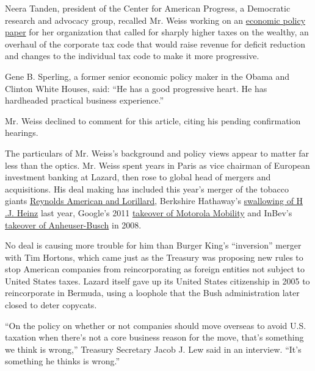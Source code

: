 Neera Tanden, president of the Center for American Progress, a
Democratic research and advocacy group, recalled Mr. Weiss working on an
\href{https://www.americanprogress.org/issues/tax-reform/report/2012/12/04/46689/reforming-our-tax-system-reducing-our-deficit/}{economic
policy paper} for her organization that called for sharply higher taxes
on the wealthy, an overhaul of the corporate tax code that would raise
revenue for deficit reduction and changes to the individual tax code to
make it more progressive.

Gene B. Sperling, a former senior economic policy maker in the Obama and
Clinton White Houses, said: ``He has a good progressive heart. He has
hardheaded practical business experience.''

Mr. Weiss declined to comment for this article, citing his pending
confirmation hearings.

The particulars of Mr. Weiss's background and policy views appear to
matter far less than the optics. Mr. Weiss spent years in Paris as vice
chairman of European investment banking at Lazard, then rose to global
head of mergers and acquisitions. His deal making has included this
year's merger of the tobacco giants
\href{http://dealbook.nytimes3xbfgragh.onion/2014/07/15/reynolds-american-to-buy-lorillard-for-27-4-billion/}{Reynolds
American and Lorillard}, Berkshire Hathaway's
\href{http://dealbook.nytimes3xbfgragh.onion/2013/02/14/berkshire-and-3g-capital-to-buy-heinz-for-23-billion}{swallowing
of H .J. Heinz} last year, Google's 2011
\href{dealbook.nytimes3xbfgragh.onion/2011/08/15/google-to-buy-motorola-mobility/}{takeover
of Motorola Mobility} and InBev's
\href{http://www.nytimes3xbfgragh.onion/2008/07/14/business/worldbusiness/14beer.html}{takeover
of Anheuser-Busch} in 2008.

No deal is causing more trouble for him than Burger King's ``inversion''
merger with Tim Hortons, which came just as the Treasury was proposing
new rules to stop American companies from reincorporating as foreign
entities not subject to United States taxes. Lazard itself gave up its
United States citizenship in 2005 to reincorporate in Bermuda, using a
loophole that the Bush administration later closed to deter copycats.

``On the policy on whether or not companies should move overseas to
avoid U.S. taxation when there's not a core business reason for the
move, that's something we think is wrong,'' Treasury Secretary Jacob J.
Lew said in an interview. ``It's something he thinks is wrong.''


